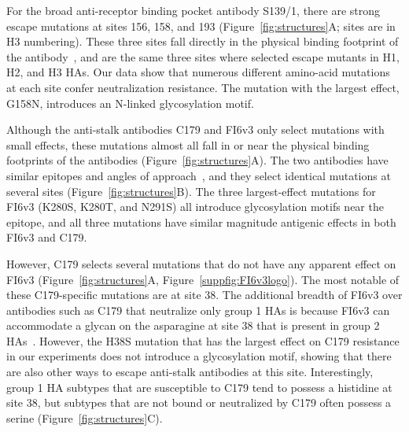 \documentclass[11pt]{article}
\begin{document}
For the broad anti-receptor binding pocket antibody S139/1, there are strong escape mutations at sites 156, 158, and 193 (Figure~\ref{fig:structures}A; sites are in H3 numbering). 
These three sites fall directly in the physical binding footprint of the antibody~\citep{lee2012heterosubtypic}, and are the same three sites where \citet{yoshida2009cross} selected escape mutants in H1, H2, and H3 HAs. 
Our data show that numerous different amino-acid mutations at each site confer neutralization resistance.
The mutation with the largest effect, G158N, introduces an N-linked glycosylation motif.

Although the anti-stalk antibodies C179 and FI6v3 only select mutations with small effects, these mutations almost all fall in or near the physical binding footprints of the antibodies (Figure~\ref{fig:structures}A).
The two antibodies have similar epitopes and angles of approach~\citep{dreyfus2013structure}, and they select identical mutations at several sites (Figure~\ref{fig:structures}B). 
The three largest-effect mutations for FI6v3 (K280S, K280T, and N291S) all introduce glycosylation motifs near the epitope, and all three mutations have similar magnitude antigenic effects in both FI6v3 and C179.

However, C179 selects several mutations that do not have any apparent effect on FI6v3 (Figure~\ref{fig:structures}A, Figure~\ref{suppfig:FI6v3logo}).
The most notable of these C179-specific mutations are at site 38.
The additional breadth of FI6v3 over antibodies such as C179 that neutralize only group 1 HAs is because FI6v3 can accommodate a glycan on the asparagine at site 38 that is present in group 2 HAs~\citep{corti2011neutralizing,sui2009structural,ekiert2009antibody}. 
However, the H38S mutation that has the largest effect on C179 resistance in our experiments does not introduce a glycosylation motif, showing that there are also other ways to escape anti-stalk antibodies at this site.
Interestingly, group 1 HA subtypes that are susceptible to C179 tend to possess a histidine at site 38, but subtypes that are not bound or neutralized by C179 often possess a serine (Figure~\ref{fig:structures}C). 
\end{document}
